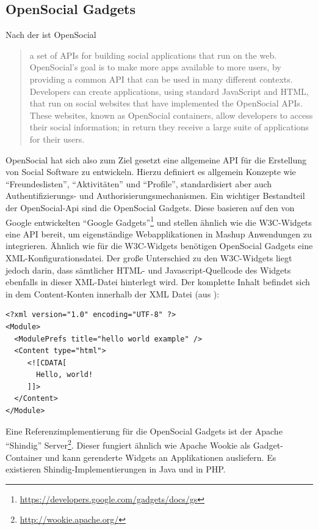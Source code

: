 \subsection{OpenSocial Gadgets}\label{section:opensocial_gadgets}
Nach der \cite{Opensocial2013} ist OpenSocial
\begin{quotation}
  a set of APIs for building social applications that run on the web. OpenSocial's goal is to make more apps available to more users, by providing a common API that can be used in many different contexts. Developers can create applications, using standard JavaScript and HTML, that run on social websites that have implemented the OpenSocial APIs. These websites, known as OpenSocial containers, allow developers to access their social information; in return they receive a large suite of applications for their users.
\end{quotation}
OpenSocial hat sich also zum Ziel gesetzt eine allgemeine API für die Erstellung von Social Software zu entwickeln. Hierzu definiert es allgemein Konzepte wie "`Freundeslisten"', "`Aktivitäten"' und "`Profile"', standardisiert aber auch Authentifizierungs- und Authorisierungsmechanismen. Ein wichtiger Bestandteil der OpenSocial-Api sind die OpenSocial Gadgets. Diese basieren auf den von Google entwickelten "`Google Gadgets"'\footnote{\url{https://developers.google.com/gadgets/docs/gs}} und stellen ähnlich wie die W3C-Widgets eine API bereit, um eigenständige Webapplikationen in Mashup Anwendungen zu integrieren. Ähnlich wie für die W3C-Widgets benötigen OpenSocial Gadgets eine XML-Konfigurationsdatei. Der große Unterschied zu den W3C-Widgets liegt jedoch darin, dass sämtlicher HTML- und Javascript-Quellcode des Widgets ebenfalls in dieser XML-Datei hinterlegt wird. Der komplette Inhalt befindet sich in dem Content-Konten innerhalb der XML Datei (aus \cite{GoogleGadgetsApi2012}): 
\begin{lstlisting}
<?xml version="1.0" encoding="UTF-8" ?> 
<Module>
  <ModulePrefs title="hello world example" /> 
  <Content type="html">
     <![CDATA[ 
       Hello, world!
     ]]>
  </Content> 
</Module>
\end{lstlisting}
Eine Referenzimplementierung für die OpenSocial Gadgets ist der Apache "`Shindig"' Server\footnote{\url{http://wookie.apache.org/}}. Dieser fungiert ähnlich wie Apache Wookie als Gadget-Container und kann gerenderte Widgets an Applikationen ausliefern. Es existieren Shindig-Implementierungen in Java und in PHP.

